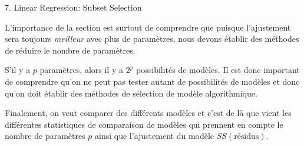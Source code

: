 \documentclass[12pt, titlepage, french]{report}
\begin{document}
\begin{CHPT_SUMM}[label = {VALID-SUBSETS}]{7. Linear Regression:  Subset Selection}
L'importance de la section est surtout de comprendre que puisque l'ajustement sera toujours \textit{meilleur} avec plus de paramètres, nous devons établir des méthodes de réduire le nombre de paramètres. 

S'il y a $p$ paramètres, alors il y a $2^{p}$ possibilités de modèles. Il est donc important de comprendre qu'on ne peut pas tester autant de possibilités de modèles et donc qu'on doit établir des méthodes de sélection de modèle algorithmique.

Finalement, on veut comparer des différents modèles et c'est de là que vient les différentes statistiques de comparaison de modèles qui prennent en compte le nombre de paramètres $p$ ainsi que l'ajustement du modèle $SS(\text{résidus})$.


\end{CHPT_SUMM}
\end{document}
